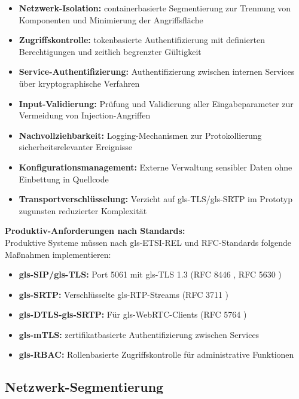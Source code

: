 \begin{itemize}
  \item \textbf{Netzwerk-Isolation:} containerbasierte Segmentierung zur Trennung von Komponenten und Minimierung der Angriffsfläche
  \item \textbf{Zugriffskontrolle:} tokenbasierte Authentifizierung mit definierten Berechtigungen und zeitlich begrenzter Gültigkeit
  \item \textbf{Service-Authentifizierung:} Authentifizierung zwischen internen Services über kryptographische Verfahren
  \item \textbf{Input-Validierung:} Prüfung und Validierung aller Eingabeparameter zur Vermeidung von Injection-Angriffen
  \item \textbf{Nachvollziehbarkeit:} Logging-Mechanismen zur Protokollierung sicherheitsrelevanter Ereignisse
  \item \textbf{Konfigurationsmanagement:} Externe Verwaltung sensibler Daten ohne Einbettung in Quellcode
  \item \textbf{Transportverschlüsselung:} Verzicht auf \gls{gls-TLS}/\gls{gls-SRTP} im Prototyp zugunsten reduzierter Komplexität
\end{itemize}
\textbf{Produktiv-Anforderungen nach Standards:}\\
Produktive Systeme müssen nach \gls{gls-ETSI}-REL \parencite{ETSI-REL} und RFC-Standards folgende Ma\ss nahmen implementieren:

\begin{itemize}
  \item \textbf{\gls{gls-SIP}/\gls{gls-TLS}:} Port 5061 mit \gls{gls-TLS} 1.3 (RFC 8446 \parencite{rfc8446}, RFC 5630 \parencite{rfc5630})
  \item \textbf{\gls{gls-SRTP}:} Verschlüsselte \gls{gls-RTP}-Streams (RFC 3711 \parencite{rfc3711})
  \item \textbf{\gls{gls-DTLS}-\gls{gls-SRTP}:} Für \gls{gls-WebRTC}-Clients (RFC 5764 \parencite{rfc5764})
  \item \textbf{\gls{gls-mTLS}:} zertifikatbasierte Authentifizierung zwischen Services \parencite{rfc8446}
  \item \textbf{\gls{gls-RBAC}:} Rollenbasierte Zugriffskontrolle für administrative Funktionen \parencite{KubernetesDocs}
\end{itemize}

\subsection{Netzwerk-Segmentierung}

